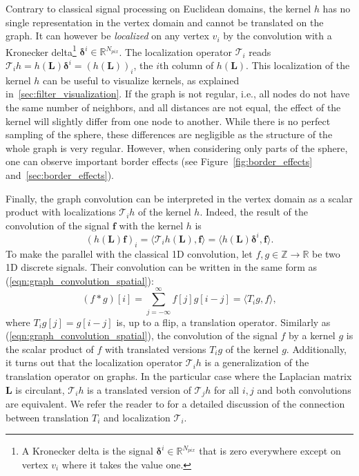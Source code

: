 \documentclass[final,twocolumn,3p,times,authoryear]{elsarticle}
\newcommand{\figref}[1]{Figure~\ref{fig:#1}}
\newcommand{\eqnref}[1]{(\ref{eqn:#1})}
\renewcommand{\b}[1]{{\bm{#1}}}   %
\newcommand{\1}{\b{1}}              %
\newcommand{\0}{\b{0}}              %
\renewcommand{\L}{\b{L}}
\newcommand{\f}{\b{f}}
\newcommand{\R}{\mathbb{R}}
\newcommand{\T}{\mathcal{T}}
\begin{document}
Contrary to classical signal processing on Euclidean domains, the kernel $h$ has no single representation in the vertex domain and cannot be translated on the graph. It can however be \textit{localized} on any vertex $v_i$ by the convolution with a Kronecker delta\footnote{A Kronecker delta is the signal $\b \delta^i \in \R^{N_{pix}}$ that is zero everywhere except on vertex $v_i$ where it takes the value one.} $\b \delta^i \in \R^{N_{pix}}$. The localization operator $\T_i$ reads $\T_i h = h(\L) \b \delta^i = (h(\L))_i$, the $i$th column of $h(\L)$.
This localization of the kernel $h$ can be useful to visualize kernels, as explained in~\ref{sec:filter_visualization}.
If the graph is not regular, i.e., all nodes do not have the same number of neighbors, and all distances are not equal, the effect of the kernel will slightly differ from one node to another. While there is no perfect sampling of the sphere, these differences are negligible as the structure of the whole graph is very regular. However, when considering only parts of the sphere, one can observe important border effects (see \figref{border_effects} and~\ref{sec:border_effects}).

Finally, the graph convolution can be interpreted in the vertex domain as a scalar product with localizations $\T_i h$ of the kernel $h$. Indeed, the result of the convolution of the signal $\f$ with the kernel $h$ is
\begin{equation} \label{eqn:graph_convolution_spatial}
	(h(\L) \f)_i = \langle \T_i h(\L), \f \rangle = \langle h(\L) \b \delta^i, \f \rangle.
\end{equation}
To make the parallel with the classical 1D convolution, let $f, g\in \mathbb{Z} \rightarrow \mathbb{R}$ be two 1D discrete signals. Their convolution can be written in the same form as \eqnref{graph_convolution_spatial}:
\begin{equation*}
	(f \ast g) [i] = \sum_{j=-\infty}^\infty f[j] g[i-j] = \langle T_i g,  f \rangle,
\end{equation*}
where $T_i g[j] = g[i-j]$ is, up to a flip, a translation operator. 
Similarly as \eqnref{graph_convolution_spatial}, the convolution of the signal $f$ by a kernel $g$ is the scalar product of $f$ with translated versions $T_i g$ of the kernel $g$.
Additionally, it turns out that the localization operator $\T_i h$ is a generalization of the translation operator on graphs. In the particular case where the Laplacian matrix $\L$ is circulant, $\T_i h$ is a translated version of $\T_j h$ for all $i, j$ and both convolutions are equivalent. We refer the reader to \citet[Sec 2.2]{perraudin2017stationary} for a detailed discussion of the connection between translation $T_i$ and localization $\T_i$.
\end{document}

